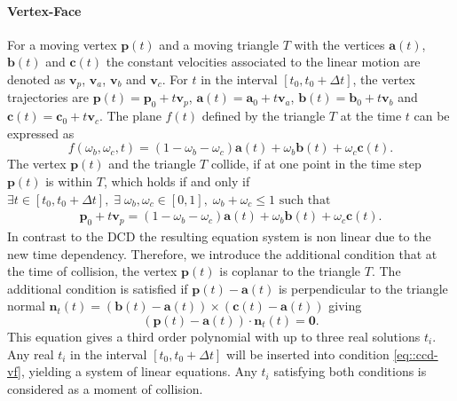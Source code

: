 \paragraph{Vertex-Face}
For a moving vertex $\mathbf p(t)$ and a moving triangle $T$ with the vertices $\mathbf a(t)$, $\mathbf b(t)$ and $\mathbf c(t)$ the constant velocities associated to the linear motion are denoted as $\mathbf v_p$, $\mathbf v_a$, $\mathbf v_b$ and $\mathbf v_c$. For $t$ in the interval $[t_0,t_0+\Delta t]$, the vertex trajectories are $\mathbf p(t)=\mathbf p_0+t\mathbf v_p$, $\mathbf a(t)=\mathbf a_0+t\mathbf v_a$, $\mathbf b(t)=\mathbf b_0+t\mathbf v_b$ and  $\mathbf c(t)=\mathbf c_0+t\mathbf v_c$. The plane $f(t)$ defined by the triangle $T$ at the time $t$ can be expressed as
\begin{equation}
f(\omega_b,\omega_c,t)=(1-\omega_b-\omega_c)\mathbf a(t) +\omega_b \mathbf b(t) + \omega_c \mathbf c(t).
\end{equation}
The vertex $\mathbf p(t)$ and the triangle $T$ collide, if at one point in the time step $\mathbf p(t)$  is within $T$, which holds if and only if $\exists t \in [t_0,t_0+\Delta t], \; \exists \; \omega_b, \omega_c \in [0,1], \; \omega_b+\omega_c\le1 \text{ such that}$
\begin{gather}
\label{eq::ccd-vf}
\mathbf p_0+t\mathbf v_p=(1-\omega_b-\omega_c)\mathbf a(t) +\omega_b \mathbf b(t) + \omega_c \mathbf c(t).
\end{gather}
In contrast to the DCD the resulting equation system is non linear due to the new time dependency.
Therefore, we introduce the additional condition that at the time of collision, the vertex $\mathbf p(t)$ is coplanar to the triangle $T$. The additional condition is satisfied if $\mathbf{p}(t)-\mathbf{a}(t)$ is perpendicular to the triangle normal $\mathbf{n}_t(t)=(\mathbf{b}(t)-\mathbf{a}(t))\times(\mathbf{c}(t)-\mathbf{a}(t))$ giving
\begin{equation}
(\mathbf{p}(t)-\mathbf{a}(t)) \cdot \mathbf{n}_t(t)= \mathbf 0.
\end{equation}
This equation gives a third order polynomial with up to three real solutions $t_i$.
Any real $t_i$ in the interval $[t_0,t_0+\Delta t]$ will be inserted into condition \ref{eq::ccd-vf}, yielding a system of linear equations. Any $t_i$ 
satisfying both conditions is considered as a moment of collision.

